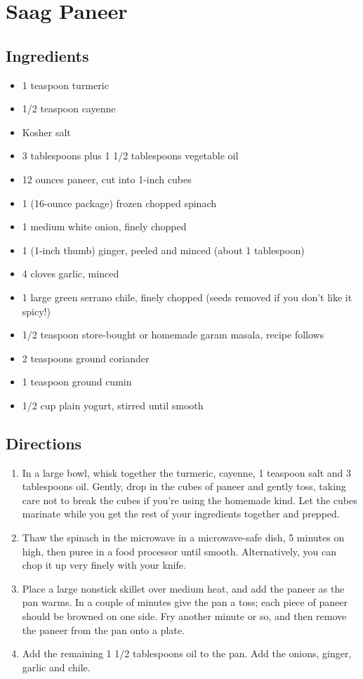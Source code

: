 \documentclass[oneside,11pt]{book}
\newcommand{\Ingredients}[1]{
    \subsection*{Ingredients}
    \begin{itemize} 
        #1 
    \end{itemize}
}
\newcommand{\Directions}[1]{
    \subsection*{Directions}
    \begin{enumerate} 
        #1 
    \end{enumerate}
}
\newcommand{\recipe}[3]{
	\pagebreak
    \section*{ \hspace{-12pt} #1 }
    \addcontentsline{toc}{section}{ \hspace{-6pt} #1 }
	
	\begin{minipage}[t]{0.35\textwidth}
	    #2
	\end{minipage}
	\hspace{0.05\textwidth}
	\begin{minipage}[t]{0.6\textwidth}
	    #3
	\end{minipage}
}
\begin{document}
    \recipe{Saag Paneer}{
        \Ingredients{
            \item 1 teaspoon turmeric
            \item 1/2 teaspoon cayenne
            \item Kosher salt
            \item 3 tablespoons plus 1 1/2 tablespoons vegetable oil
            \item 12 ounces paneer, cut into 1-inch cubes
            \item 1 (16-ounce package) frozen chopped spinach
            \item 1 medium white onion, finely chopped
            \item 1 (1-inch thumb) ginger, peeled and minced (about 1 tablespoon)
            \item 4 cloves garlic, minced
            \item 1 large green serrano chile, finely chopped (seeds removed if you don't like it spicy!)
            \item 1/2 teaspoon store-bought or homemade garam masala, recipe follows
            \item 2 teaspoons ground coriander
            \item 1 teaspoon ground cumin
            \item 1/2 cup plain yogurt, stirred until smooth
        }
	}{
        \Directions{
            \item In a large bowl, whisk together the turmeric, cayenne, 1 teaspoon salt and 3 tablespoons oil. 
                Gently, drop in the cubes of paneer and gently toss, taking care not to break the cubes if you're using the homemade kind. 
                Let the cubes marinate while you get the rest of your ingredients together and prepped.
            \item Thaw the spinach in the microwave in a microwave-safe dish, 5 minutes on high, then puree in a food processor until smooth. 
                Alternatively, you can chop it up very finely with your knife.
            \item Place a large nonstick skillet over medium heat, and add the paneer as the pan warms. 
                In a couple of minutes give the pan a toss; each piece of paneer should be browned on one side. 
                Fry another minute or so, and then remove the paneer from the pan onto a plate.
            \item Add the remaining 1 1/2 tablespoons oil to the pan. 
                Add the onions, ginger, garlic and chile. 
}}
\end{document}
